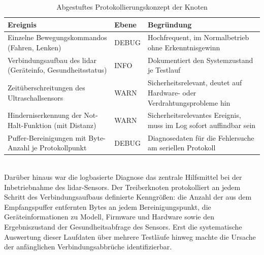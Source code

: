 \begin{table}[h!]
    \centering
    \small
    \begin{tabular}{p{5.4cm} p{2.0cm} p{6.8cm}}
        \toprule
        \textbf{Ereignis}                                                 & \textbf{Ebene} & \textbf{Begründung}                                                     \\
        \midrule
        Einzelne Bewegungskommandos (Fahren, Lenken)                      & DEBUG          & Hochfrequent, im Normalbetrieb ohne Erkenntnisgewinn                    \\
        Verbindungsaufbau des \gls{lidar} (Geräteinfo, Gesundheitsstatus) & INFO           & Dokumentiert den Systemzustand je Testlauf                              \\
        Zeitüberschreitungen des Ultraschallsensors                       & WARN           & Sicherheitsrelevant, deutet auf Hardware- oder Verdrahtungsprobleme hin \\
        Hinderniserkennung der Not-Halt-Funktion (mit Distanz)            & WARN           & Sicherheitsrelevantes Ereignis, muss im Log sofort auffindbar sein      \\
        Puffer-Bereinigungen mit Byte-Anzahl je Protokollpunkt            & DEBUG          & Diagnosedaten für die Fehlersuche am seriellen Protokoll                \\
        \bottomrule
    \end{tabular}
    \caption{Abgestuftes Protokollierungskonzept der Knoten}
    \label{tab:log_ebenen}
\end{table}
\\
Darüber hinaus war die logbasierte Diagnose das zentrale Hilfsmittel bei der Inbetriebnahme des \gls{lidar}-Sensors. Der Treiberknoten protokolliert an jedem Schritt des Verbindungsaufbaus definierte Kenngrößen: die Anzahl der aus dem Empfangspuffer entfernten Bytes an jedem Bereinigungspunkt, die Geräteinformationen zu Modell, Firmware und Hardware sowie den Ergebniszustand der Gesundheitsabfrage des Sensors. Erst die systematische Auswertung dieser Laufdaten über mehrere Testläufe hinweg machte die Ursache der anfänglichen Verbindungsabbrüche identifizierbar.
